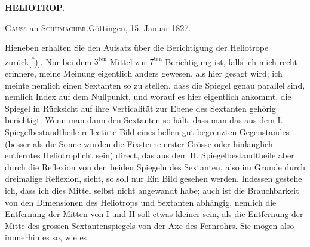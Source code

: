 \par\clearpage
\noindent\null\hfill{\small\textbf{HELIOTROP.}}\hfill{}\par\bigskip
\begin{center}{\large\textsc{Gauss} an \textsc{Schumacher}.\quad Göttingen, 15. Januar 1827.}\end{center}
\par\noindent\hspace*{\parindent}Hieneben erhalten Sie den Aufsatz über die Berichtigung der Heliotrope zurück[\textsuperscript{*})]. Nur bei dem $3^{\mathrm{ten}}$ Mittel zur $7^{\mathrm{ten}}$ Berichtigung ist, falls ich mich recht erinnere, meine Meinung eigentlich anders gewesen, als hier gesagt wird; ich meinte nemlich einen Sextanten so zu stellen, dass die Spiegel genau parallel sind, nemlich Index auf dem  Nullpunkt, und worauf es hier eigentlich ankommt, die Spiegel in Rücksicht auf ihre Verticalität zur Ebene des Sextanten gehörig berichtigt. Wenn man dann den Sextanten so hält, dass man das aus dem I. Spiegelbestandtheile reflectirte Bild eines hellen gut begrenzten Gegenstandes (besser als die Sonne würden die Fixsterne erster Grösse oder hinlänglich entferntes Heliotroplicht sein) direct, das aus dem II. Spiegelbestandtheile aber durch die Reflexion von den beiden Spiegeln des Sextanten, also im Grunde durch dreimalige Reflexion, sieht, so soll nur Ein Bild gesehen werden. Indessen gestehe ich, dass ich dies Mittel selbst nicht angewandt habe; auch ist die Brauchbarkeit von den Dimensionen des Heliotrops und Sextanten abhängig, nemlich die Entfernung der Mitten von I und II soll etwas kleiner sein, als die Entfernung der Mitte des grossen Sextantenspiegels von der Axe des Fernrohrs. Sie mögen also immerhin es so, wie es
